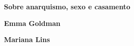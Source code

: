 \textbf{Sobre anarquismo, sexo e casamento} \lipsum[1]

\textbf{Emma Goldman} \lipsum[2]

\textbf{Mariana Lins} \lipsum[3]


